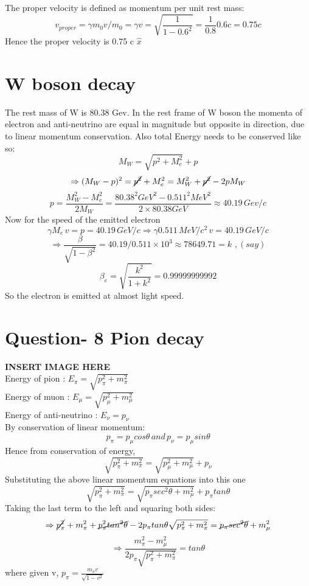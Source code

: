 \documentclass[11pt]{article}
\begin{document}
	The proper velocity is defined as momentum per unit rest mass:
	\[
		v_{proper} = \gamma m_0 v/ m_0  = \gamma v = \sqrt{\frac{1}{1-0.6^2}} = \frac{1}{0.8} 0.6 c = 0.75 c 
	\]
	Hence the proper velocity is 0.75 c $\hat{x}$
	
	\section{W boson decay}
	
	The rest mass of W is 80.38 Gev.
	In the rest frame of W boson the momenta of electron and anti-neutrino are equal in magnitude but opposite in direction, due to linear momentum conservation.
	Also total Energy needs to be conserved like so:
	\[
		M_W = \sqrt{p^2 + M_e^2} + p
	\]
	\[
		\Rightarrow (M_W  -p)^2 = \cancel{p^2} + M_e^2 = M_W^2 +\cancel{p^2}-2pM_W
	\]
	\[
		p = \frac{M_W^2 - M_e^2}{2M_W} = \frac{80.38^2GeV^2 - 0.511^2 MeV^2}{2\times 80.38 GeV} \approx 40.19 \, Gev/c
	\] 
	Now for the speed of the emitted electron
	\[
		\gamma M_e \, v = p = 40.19 \, GeV/c \Rightarrow \gamma 0.511 \, MeV/c^2 \, v = 40.19 \, GeV/c 
	\]
	\[
		\Rightarrow \frac{\beta}{\sqrt{1-\beta^2}} = 40.19/0.511 \times 10^3 \approx 78649.71 = k \, \, , (say)
	\]
	\[
		\beta_e = \sqrt{\frac{k^2}{1+k^2}} = 0.99999999992
	\]
	So the electron is emitted at almost light speed.
	
	\section{\color{teal} Question- 8 Pion decay}
	
	\textbf{\color{red}INSERT IMAGE HERE}\\
	
	Energy of pion : \(E_\pi = \sqrt{p^2_\pi + m^2_\pi}\)\\
	Energy of muon : \(E_\mu = \sqrt{p_\mu^2 + m^2_\mu}\)\\
	Energy of anti-neutrino : \(E_\nu = p_\nu \)\\
	By conservation of linear momentum:\\
	\[
		p_\pi = p_\mu cos\theta \, and \,  p_\nu = p_\mu sin\theta
	\]
	Hence from conservation of energy,
	\[
		\sqrt{p^2_\pi + m^2_\pi} = \sqrt{p_\mu^2 + m^2_\mu} + p_\nu
	\]
	Substituting the above linear momentum equations into this one
	\[
		\sqrt{p^2_\pi + m^2_\pi} = \sqrt{p_\pi sec^2\theta + m^2_\mu} + p_\pi tan\theta
	\] 
	Taking the last term to the left and squaring both sides:
	\[
		\Rightarrow \cancel{p_\pi^2} + m^2_\pi + \cancel{p^2_\pi tan^2\theta} -2p_\pi tan\theta\sqrt{p^2_\pi+m^2_\pi} = \cancel{p_\pi sec^2\theta} + m^2_\mu
	\]
	\[
		\Rightarrow \boxed{\frac{m^2_\pi - m^2_\mu}{2p_\pi\sqrt{p^2_\pi+m^2_\pi}}	= tan\theta}
	\]
	where given v, \(p_\pi = \frac{m_\pi v}{\sqrt{1-v^2}}\)
	
\end{document}
